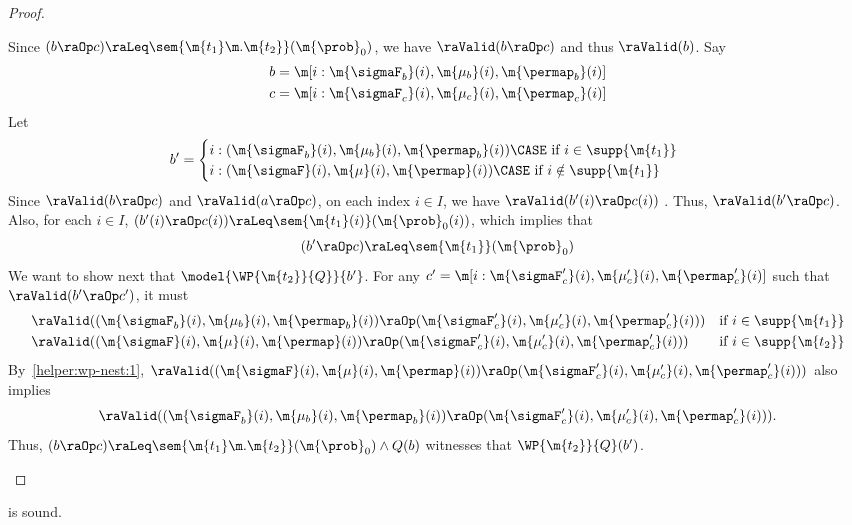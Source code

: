 \begin{proof}
\begin{itemize}
      Since $(b \raOp c) \raLeq \sem{\m{t_1} \m. \m{t_2}}(\m{\prob}_0)
      $, we have $\raValid(b \raOp c)$ and thus $\raValid(b)$. Say
      \begin{align*}
        b &= \m[i: \m{\sigmaF_b}(i), \m{\mu_b}(i), \m{\permap_b}(i)] \\
        c &= \m[i: \m{\sigmaF_c}(i), \m{\mu_c}(i), \m{\permap_c}(i)]
\end{align*}
      Let
      \begin{align*}
        b' &=
        \begin{cases}
          i:  (\m{\sigmaF_b}(i), \m{\mu_b}(i), \m{\permap_b}(i)) \CASE \text{ if $i \in \supp{\m{t_1}}$} \\
          i : (\m{\sigmaF}(i), \m{\mu}(i), \m{\permap}(i)) \CASE \text{ if $i \notin \supp{\m{t_1}}$ }
        \end{cases}
      \end{align*}
      Since $\raValid(b \raOp c)$ and  $\raValid(a \raOp c)$,
      on each index $i \in I$, we have $\raValid(b'(i) \raOp c(i))$  .
      Thus, $\raValid(b' \raOp c)$.
      Also, for each $i \in I$,
      $(b'(i) \raOp c(i)) \raLeq \sem{\m{t_1}(i)}(\m{\prob}_0(i))$,
      which implies that
      \[
          (b' \raOp c) \raLeq \sem{\m{t_1}}(\m{\prob}_0)
      \]
      We want to show next that
      $\model{\WP {\m{t_2}} {Q}}{b'}$.
      For any $c' = \m[i: \m{\sigmaF'_c}(i), \m{\mu'_c}(i), \m{\permap'_c}(i)]$
      such that $\raValid(b' \raOp c')$,
      it must
      \begin{align*}
        &\raValid((\m{\sigmaF_b}(i), \m{\mu_b}(i), \m{\permap_b}(i)) \raOp (\m{\sigmaF'_c}(i), \m{\mu'_c}(i), \m{\permap'_c}(i)))  &\text{if } i \in \supp{\m{t_1}} \\
        &\raValid((\m{\sigmaF}(i), \m{\mu}(i), \m{\permap}(i)) \raOp (\m{\sigmaF'_c}(i), \m{\mu'_c}(i), \m{\permap'_c}(i)))  &\text{if } i  \in \supp{\m{t_2}}
      \end{align*}
      By~\cref{helper:wp-nest:1},
      $\raValid((\m{\sigmaF}(i), \m{\mu}(i), \m{\permap}(i)) \raOp (\m{\sigmaF'_c}(i), \m{\mu'_c}(i), \m{\permap'_c}(i)))$
      also implies
      \[
        \raValid((\m{\sigmaF_b}(i), \m{\mu_b}(i), \m{\permap_b}(i)) \raOp (\m{\sigmaF'_c}(i), \m{\mu'_c}(i), \m{\permap'_c}(i))).
      \]
      Thus,
      $(b \raOp c) \raLeq \sem{\m{t_1} \m. \m{t_2}}(\m{\prob}_0)
          \land
          Q(b)$
          witnesses that
           $\WP {\m{t_2}} {Q}(b')$.
  \end{itemize}
\end{proof}
 \begin{lemma}
\label{proof:wp-conj}
   is sound.
\end{lemma}

